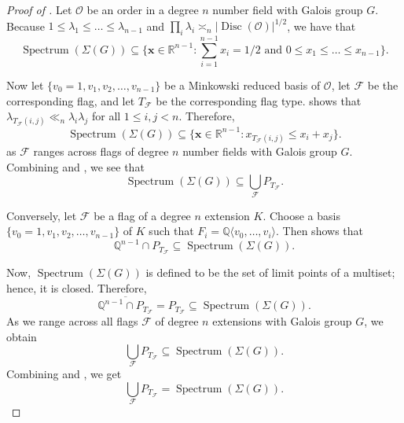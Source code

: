 \documentclass[letterpaper,10pt]{amsart}
\DeclareMathOperator{\Spe}{Spectrum}
\DeclareMathOperator{\Disc}{Disc}
\newcommand{\QQ}{\mathbb{Q}}      %
\newcommand{\RR}{\mathbb{R}}      %
\newcommand{\cO}{\mathcal{O}}      %
\newcommand{\la}{\langle}
\newcommand{\ra}{\rangle}
\newcommand{\cF}{\mathcal{F}}
\theoremstyle{definition}
\theoremstyle{remark}
\begin{document}
\begin{proof}[Proof of ]
Let $\cO$ be an order in a degree $n$ number field with Galois group $G$. Because $1 \leq \lambda_1 \leq \dots \leq \lambda_{n-1}$ and $\prod_i \lambda_i \asymp_n \lvert \Disc(\cO) \rvert^{1/2}$, we have that
\begin{equation}
\label{eqn:basic-constraints}
    \Spe(\Sigma(G)) \subseteq \{\mathbf{x} \in \RR^{n-1} : \sum_{i=1}^{n-1} x_i = 1/2 \text{ and } 0 \leq x_1 \leq \dots \leq x_{n-1}\}.
\end{equation}

Now let $\{v_0=1, v_1, v_2,\dots,v_{n-1}\}$ be a Minkowski reduced basis of $\cO$, let $\cF$ be the corresponding flag, and let $T_{\cF}$ be the corresponding flag type.  shows that $\lambda_{T_{\cF}(i,j)} \ll_n \lambda_i \lambda_j$ for all $1 \leq i,j < n$. Therefore, 
\begin{equation}
\label{eqn:nontriv-constraints}
\Spe(\Sigma(G)) \subseteq \{\mathbf{x} \in \RR^{n-1} : x_{T_{\cF}(i,j) }\leq x_i + x_j\}.
\end{equation}
as $\cF$ ranges across flags of degree $n$ number fields with Galois group $G$. Combining  and , we see that 
\begin{equation}
\label{eqn:one-inclusion}
\Spe(\Sigma(G)) \subseteq \bigcup_{\cF} P_{T_{\cF}}.
\end{equation}

Conversely, let $\cF$ be a flag of a degree $n$ extension $K$. Choose a basis $\{v_0=1, v_1, v_2,\dots,v_{n-1}\}$ of $K$ such that $F_i = \QQ\la v_0,\dots,v_i\ra$. Then  shows that
\[
    \QQ^{n-1} \cap P_{T_{\cF}} \subseteq \Spe(\Sigma(G)).
\]

Now, $\Spe(\Sigma(G))$ is defined to be the set of limit points of a multiset; hence, it is closed. Therefore, 
\[
    \overline{\QQ^{n-1} \cap P_{T_{\cF}}} = P_{T_{\cF}} \subseteq \Spe(\Sigma(G)).
\]
As we range across all flags $\cF$ of degree $n$ extensions with Galois group $G$, we obtain 
\begin{equation}
\label{eqn:second-inclusion}
\bigcup_{\cF} P_{T_{\cF}} \subseteq \Spe(\Sigma(G)).
\end{equation}
Combining  and , we get
\[
\bigcup_{\cF} P_{T_{\cF}} = \Spe(\Sigma(G)).
\]

\end{proof}
\end{document}
